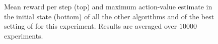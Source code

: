 \documentclass[conference]{IEEEtran}
\begin{document}
\begin{figure}[t]
\begin{minipage}{\columnwidth}
\centering
  \hspace{-.5cm}
\end{minipage}
  \caption{Mean reward per step (top) and maximum action-value estimate in the initial state (bottom) of all the other algorithms and of the best setting of \alg for this experiment. Results are averaged over $10000$ experiments.}
  \label{F:hasselt_all}
\end{figure}
\end{document}
